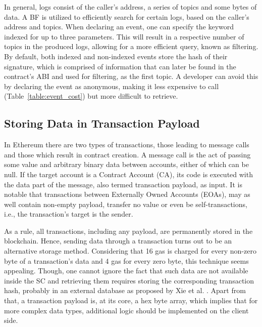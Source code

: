 In general, logs consist of the caller’s address, a series of topics and some bytes of data. A BF is utilized to efficiently search for certain logs, based on the caller’s address and topics. When declaring an event, one can specify the keyword indexed for up to three parameters. This will result in a respective number of topics in the produced logs, allowing for a more efficient query, known as filtering. By default, both indexed and non-indexed events store the hash of their signature, which is comprised of information that can later be found in the contract’s ABI and used for filtering, as the first topic. A developer can avoid this by declaring the event as anonymous, making it less expensive to call (Table~\ref{table:event_cost}) but more difficult to retrieve.

\begin{table}[htbp]
\caption{Generalized cost model for different types of events}
\label{table:event_cost}
\end{table}

\subsection{Storing Data in Transaction Payload}\label{subsection:}
In Ethereum there are two types of transactions, those leading to message calls and those which result in contract creation. A message call is the act of passing some value and arbitrary binary data between accounts, either of which can be null. If the target account is a Contract Account (CA), its code is executed with the data part of the message, also termed transaction payload, as input. It is notable that transactions between Externally Owned Accounts (EOAs), may as well contain non-empty payload, transfer no value or even be self-transactions, i.e., the transaction's target is the sender.

As a rule, all transactions, including any payload, are permanently stored in the blockchain. Hence, sending data through a transaction turns out to be an alternative storage method. Considering that 16 gas is charged for every non-zero byte of a transaction’s data and 4 gas for every zero byte, this technique seems appealing. Though, one cannot ignore the fact that such data are not available inside the SC and retrieving them requires storing the corresponding transaction hash, probably in an external database as proposed by Xie et al. \citep{xie_2017}. Apart from that, a transaction payload is, at its core, a hex byte array, which implies that for more complex data types, additional logic should be implemented on the client side.

